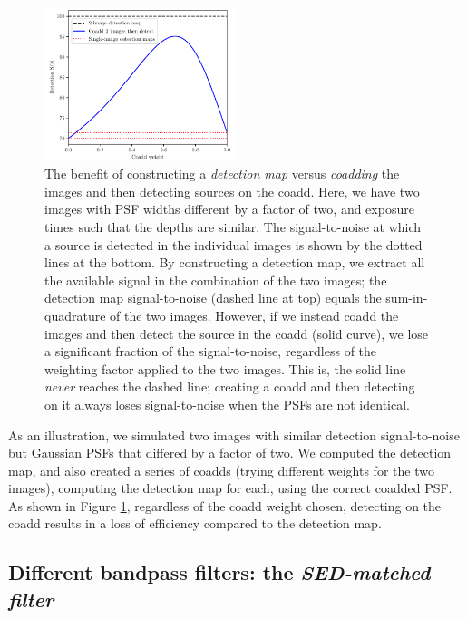 \documentclass[11pt,letterpaper,linenumbers]{aastex63}
\begin{document}
\begin{figure}[h]
  \begin{center}
  \includegraphics[width=0.5\textwidth]{dont-coadd}
  \caption{The benefit of constructing a \emph{detection map} versus
    \emph{coadding} the images and then detecting sources on the
    coadd.  Here, we have two images with PSF widths different by a
    factor of two, and exposure times such that the depths are
    similar.  The signal-to-noise at which a source is detected in the
    individual images is shown by the dotted lines at the bottom.  By
    constructing a detection map, we extract all the available signal
    in the combination of the two images; the detection map
    signal-to-noise (dashed line at top) equals the sum-in-quadrature
    of the two images.  However, if we instead coadd the images and
    then detect the source in the coadd (solid curve), we lose a
    significant fraction of the signal-to-noise, regardless of the
    weighting factor applied to the two images.  This is, the solid
    line \emph{never} reaches the dashed line; creating a coadd and
    then detecting on it always loses signal-to-noise when the PSFs
    are not identical.
    \label{fig:dontcoadd}}
  \end{center}
\end{figure}

%
As an illustration, we simulated two images with similar detection
signal-to-noise but Gaussian PSFs that differed by a factor of two.
We computed the detection map, and also created a series of coadds
(trying different weights for the two images), computing the detection
map for each, using the correct coadded PSF.  As shown in Figure
\ref{fig:dontcoadd}, regardless of the coadd weight chosen, detecting
on the coadd results in a loss of efficiency compared to the detection
map.


\subsection{Different bandpass filters: the \emph{SED-matched filter}}
\label{sec:sedmatched}
\end{document}
